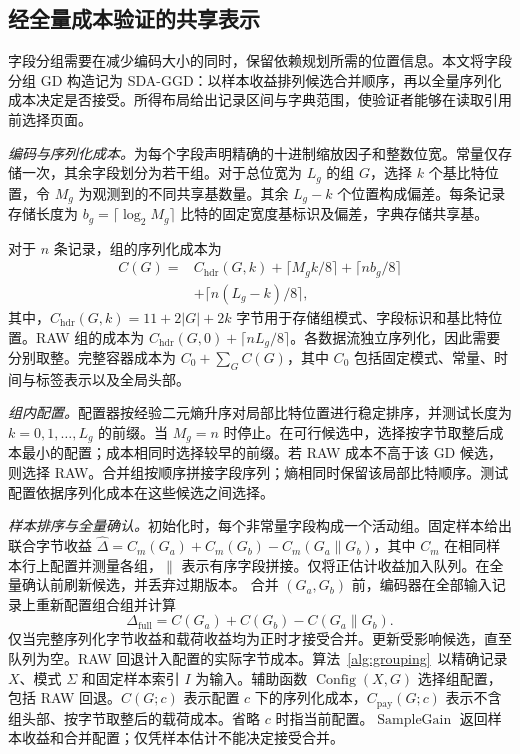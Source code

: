 \documentclass[10pt,journal]{IEEEtran}
\begin{document}
\subsection{经全量成本验证的共享表示}\label{sec:c1}
字段分组需要在减少编码大小的同时，保留依赖规划所需的位置信息。本文将字段分组 GD 构造记为 SDA-GGD：以样本收益排列候选合并顺序，再以全量序列化成本决定是否接受。所得布局给出记录区间与字典范围，使验证者能够在读取引用前选择页面。

\emph{编码与序列化成本。}为每个字段声明精确的十进制缩放因子和整数位宽。常量仅存储一次，其余字段划分为若干组。对于总位宽为 $L_g$ 的组 $G$，选择 $k$ 个基比特位置，令 $M_g$ 为观测到的不同共享基数量。其余 $L_g-k$ 个位置构成偏差。每条记录存储长度为 $b_g=\lceil\log_2M_g\rceil$ 比特的固定宽度基标识及偏差，字典存储共享基。

对于 $n$ 条记录，组的序列化成本为
\begin{equation}\label{eq:cost}
\begin{split}
C(G)={}&C_{\mathrm{hdr}}(G,k)+\lceil M_gk/8\rceil+\lceil nb_g/8\rceil\\
 &+\lceil n(L_g-k)/8\rceil,
\end{split}
\end{equation}
其中，$C_{\mathrm{hdr}}(G,k)=11+2|G|+2k$ 字节用于存储组模式、字段标识和基比特位置。RAW 组的成本为 $C_{\mathrm{hdr}}(G,0)+\lceil nL_g/8\rceil$。各数据流独立序列化，因此需要分别取整。完整容器成本为 $C_0+\sum_G C(G)$，其中 $C_0$ 包括固定模式、常量、时间与标签表示以及全局头部。

\emph{组内配置。}配置器按经验二元熵升序对局部比特位置进行稳定排序，并测试长度为 $k=0,1,\ldots,L_g$ 的前缀。当 $M_g=n$ 时停止。在可行候选中，选择按字节取整后成本最小的配置；成本相同时选择较早的前缀。若 RAW 成本不高于该 GD 候选，则选择 RAW。合并组按顺序拼接字段序列；熵相同时保留该局部比特顺序。测试配置依据序列化成本在这些候选之间选择。

\emph{样本排序与全量确认。}初始化时，每个非常量字段构成一个活动组。固定样本给出联合字节收益 $\widehat\Delta=C_m(G_a)+C_m(G_b)-C_m(G_a\mathbin{\|}G_b)$，其中 $C_m$ 在相同样本行上配置并测量各组，$\|$ 表示有序字段拼接。仅将正估计收益加入队列。在全量确认前刷新候选，并丢弃过期版本。
合并 $(G_a,G_b)$ 前，编码器在全部输入记录上重新配置组合组并计算
\begin{equation}
\Delta_{\mathrm{full}}=C(G_a)+C(G_b)-C(G_a\mathbin{\|}G_b).
\end{equation}
仅当完整序列化字节收益和载荷收益均为正时才接受合并。更新受影响候选，直至队列为空。RAW 回退计入配置的实际字节成本。算法~\ref{alg:grouping}~以精确记录 $X$、模式 $\Sigma$ 和固定样本索引 $I$ 为输入。辅助函数 $\operatorname{Config}(X,G)$ 选择组配置，包括 RAW 回退。$C(G;c)$ 表示配置 $c$ 下的序列化成本，$C_{\mathrm{pay}}(G;c)$ 表示不含组头部、按字节取整后的载荷成本。省略 $c$ 时指当前配置。$\operatorname{SampleGain}$ 返回样本收益和合并配置；仅凭样本估计不能决定接受合并。
\end{document}
